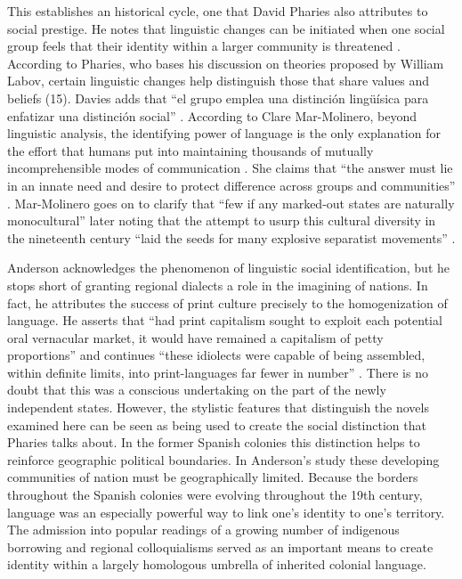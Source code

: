 \documentclass[12pt]{report}
\begin{document}
This establishes an historical cycle, one that David Pharies also attributes to social prestige.
He notes that linguistic changes can be initiated when one social group feels that their identity within a larger community is threatened \cite[15]{Davies2007}.
According to Pharies, who bases his discussion on theories proposed by William Labov, certain linguistic changes help distinguish those that share values and beliefs (15)\nocite{Pharies2007}.
Davies adds that \enquote{el grupo emplea una distinción lingüísica para enfatizar una distinción social} \cite[17]{Pharies2007}.
According to Clare Mar-Molinero, beyond linguistic analysis, the identifying power of language is the only explanation for the effort that humans put into maintaining thousands of mutually incomprehensible modes of communication \cite[2]{Molinero2005}.
She claims that \enquote{the answer must lie in an innate need and desire to protect difference across groups and communities} \cite[2]{Molinero2005}.
Mar-Molinero goes on to clarify that \enquote{few if any marked-out states are naturally monocultural} later noting that the attempt to usurp this cultural diversity in the nineteenth century \enquote{laid the seeds for many explosive separatist movements} \cite[10]{Molinero2005}.


Anderson acknowledges the phenomenon of linguistic social identification, but he stops short of granting regional dialects a role in the imagining of nations.
In fact, he attributes the success of print culture precisely to the homogenization of language.
He asserts that \enquote{had print capitalism sought to exploit each potential oral vernacular market, it would have remained a capitalism of petty proportions} and continues \enquote{these idiolects were capable of being assembled, within definite limits, into print-languages far fewer in number} \cite[43]{Anderson2006}.
There is no doubt that this was a conscious undertaking on the part of the newly independent states.
However, the stylistic features that distinguish the novels examined here can be seen as being used to create the social distinction that Pharies talks about.
In the former Spanish colonies this distinction helps to reinforce geographic political boundaries.
In Anderson's study these developing communities of nation must be geographically limited.
Because the borders throughout the Spanish colonies were evolving throughout the 19th century, language was an especially powerful way to link one's identity to one's territory.
The admission into popular readings of a growing number of indigenous borrowing and regional colloquialisms served as an important means to create identity within a largely homologous umbrella of inherited colonial language.
\end{document}
